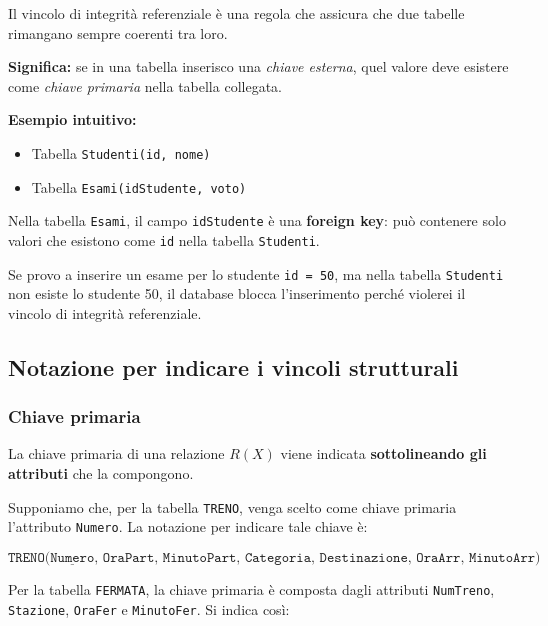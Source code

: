 \begin{itemize}
\begin{itemize}
\begin{tcolorbox}[
colback=yellow!15!white,
colframe=orange!80!black,
title=\textbf{Kristian semplifica in questo modo}
]
Il vincolo di integrità referenziale è una regola che assicura che due tabelle
rimangano sempre coerenti tra loro.

\textbf{Significa:} se in una tabella inserisco una \textit{chiave esterna},
quel valore deve esistere come \textit{chiave primaria} nella tabella collegata.

\textbf{Esempio intuitivo:}

\begin{itemize}
    \item Tabella \texttt{Studenti(id, nome)}
    \item Tabella \texttt{Esami(idStudente, voto)}
\end{itemize}

Nella tabella \texttt{Esami}, il campo \texttt{idStudente} è una \textbf{foreign key}:
può contenere solo valori che esistono come \texttt{id} nella tabella \texttt{Studenti}.

Se provo a inserire un esame per lo studente \texttt{id = 50}, ma nella tabella
\texttt{Studenti} non esiste lo studente 50, il database blocca l'inserimento
perché violerei il vincolo di integrità referenziale.
\end{tcolorbox}
    \end{itemize}
\end{itemize}
\subsection{Notazione per indicare i vincoli strutturali}

\subsubsection{Chiave primaria}

La chiave primaria di una relazione $R(X)$ viene indicata
\textbf{sottolineando gli attributi} che la compongono.

Supponiamo che, per la tabella \texttt{TRENO}, venga scelto come chiave primaria
l'attributo \texttt{Numero}.  
La notazione per indicare tale chiave è:

\[
\texttt{TRENO(}\underline{\texttt{Numero}}\texttt{, OraPart, MinutoPart, Categoria, Destinazione, OraArr, MinutoArr)}
\]

Per la tabella \texttt{FERMATA}, la chiave primaria è composta dagli attributi
\texttt{NumTreno}, \texttt{Stazione}, \texttt{OraFer} e \texttt{MinutoFer}.
Si indica così:

